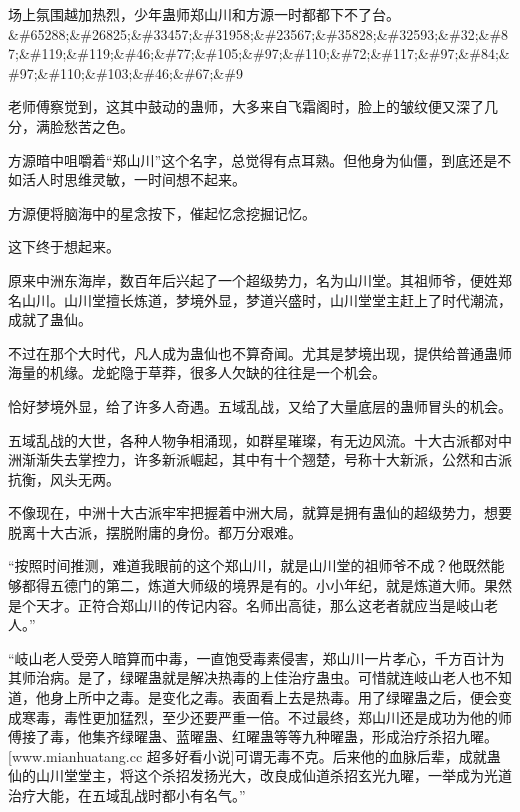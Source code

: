 
\begin{this_body}

场上氛围越加热烈，少年蛊师郑山川和方源一时都都下不了台。\&\#65288;\&\#26825;\&\#33457;\&\#31958;\&\#23567;\&\#35828;\&\#32593;\&\#32;\&\#87;\&\#119;\&\#119;\&\#46;\&\#77;\&\#105;\&\#97;\&\#110;\&\#72;\&\#117;\&\#97;\&\#84;\&\#97;\&\#110;\&\#103;\&\#46;\&\#67;\&\#9

老师傅察觉到，这其中鼓动的蛊师，大多来自飞霜阁时，脸上的皱纹便又深了几分，满脸愁苦之色。

方源暗中咀嚼着“郑山川”这个名字，总觉得有点耳熟。但他身为仙僵，到底还是不如活人时思维灵敏，一时间想不起来。

方源便将脑海中的星念按下，催起忆念挖掘记忆。

这下终于想起来。

原来中洲东海岸，数百年后兴起了一个超级势力，名为山川堂。其祖师爷，便姓郑名山川。山川堂擅长炼道，梦境外显，梦道兴盛时，山川堂堂主赶上了时代潮流，成就了蛊仙。

不过在那个大时代，凡人成为蛊仙也不算奇闻。尤其是梦境出现，提供给普通蛊师海量的机缘。龙蛇隐于草莽，很多人欠缺的往往是一个机会。

恰好梦境外显，给了许多人奇遇。五域乱战，又给了大量底层的蛊师冒头的机会。

五域乱战的大世，各种人物争相涌现，如群星璀璨，有无边风流。十大古派都对中洲渐渐失去掌控力，许多新派崛起，其中有十个翘楚，号称十大新派，公然和古派抗衡，风头无两。

不像现在，中洲十大古派牢牢把握着中洲大局，就算是拥有蛊仙的超级势力，想要脱离十大古派，摆脱附庸的身份。都万分艰难。

“按照时间推测，难道我眼前的这个郑山川，就是山川堂的祖师爷不成？他既然能够都得五德门的第二，炼道大师级的境界是有的。小小年纪，就是炼道大师。果然是个天才。正符合郑山川的传记内容。名师出高徒，那么这老者就应当是岐山老人。”

“岐山老人受旁人暗算而中毒，一直饱受毒素侵害，郑山川一片孝心，千方百计为其师治病。是了，绿曜蛊就是解决热毒的上佳治疗蛊虫。可惜就连岐山老人也不知道，他身上所中之毒。是变化之毒。表面看上去是热毒。用了绿曜蛊之后，便会变成寒毒，毒性更加猛烈，至少还要严重一倍。不过最终，郑山川还是成功为他的师傅接了毒，他集齐绿曜蛊、蓝曜蛊、红曜蛊等等九种曜蛊，形成治疗杀招九曜。[www.mianhuatang.cc 超多好看小说]可谓无毒不克。后来他的血脉后辈，成就蛊仙的山川堂堂主，将这个杀招发扬光大，改良成仙道杀招玄光九曜，一举成为光道治疗大能，在五域乱战时都小有名气。”


\end{this_body}
